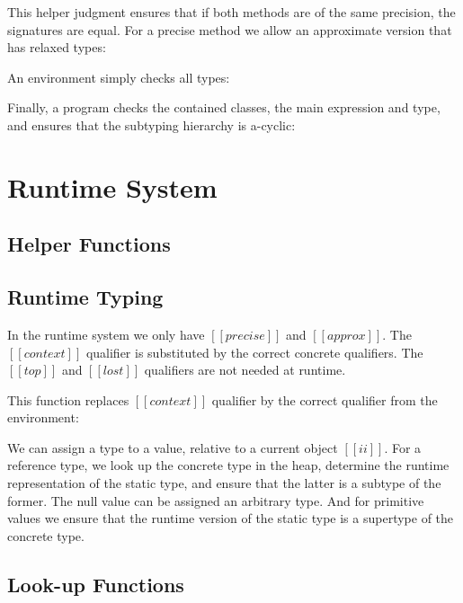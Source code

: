 \documentclass[final,10pt,twoside]{article}
\begin{document}
\ottdefnoverride


This helper judgment ensures that if both methods are of the same
precision, the signatures are equal. For a precise method we allow an
approximate version that has relaxed types:

\ottdefnoverrideaux


An environment simply checks all types:

\ottdefnswfenv


Finally, a program checks the contained classes, the main expression
and type, and ensures that the subtyping hierarchy is a-cyclic:

\ottdefnwfprg



\section{Runtime System}
\label{rt}

\subsection{Helper Functions}

\ottdefncreation

\ottdefnupdate


\subsection{Runtime Typing}

In the runtime system we only have $[[precise]]$ and $[[approx]]$.
The $[[context]]$ qualifier is substituted by the correct concrete
qualifiers.
The $[[top]]$ and $[[lost]]$ qualifiers are not needed at runtime.

This function replaces $[[context]]$ qualifier by the correct
qualifier from the environment:

\ottdefnsTXXrT


We can assign a type to a value, relative to a current object
$[[ii]]$.
For a reference type, we look up the concrete type in the heap,
determine the runtime representation of the static type, and ensure
that the latter is a subtype of the former.
The null value can be assigned an arbitrary type.
And for primitive values we ensure that the runtime version of the
static type is a supertype of the concrete type.

\ottdefnrttyping


\subsection{Look-up Functions}
\end{document}
